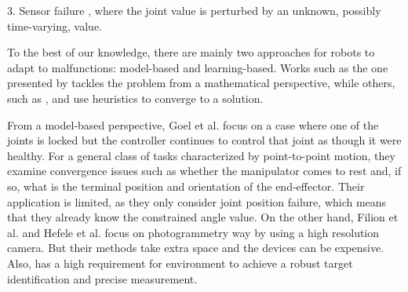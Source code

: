 \documentclass{ieeeaccess}
\begin{document}
3. Sensor failure \cite{english2000measuring},
where the joint value is perturbed by an unknown,
possibly time-varying, value. 
%
%
%
%


To the best of our knowledge, there are mainly two approaches for robots to adapt to malfunctions: model-based and learning-based. Works such as the one presented by \cite{goel2005analyzing} tackles the problem from a mathematical perspective, while others, such as \cite{7832455}, \cite{cully2015robots} and \cite{chatzilygeroudis2017black} use heuristics to converge to a solution.

From a model-based perspective, Goel et al. \cite{goel2005analyzing} focus on a case where one of the joints is locked but the controller continues to control that joint as though it were healthy. For a general class of tasks characterized by point-to-point motion, they examine convergence issues such as whether the manipulator comes to rest and, if so, what is the terminal position and orientation of the end-effector. Their application is limited, as they only consider joint position failure, which means that they already know the constrained angle value. On the other hand, Filion et al. \cite{filion2018robot} and Hefele et al.\cite{hefele2001robot} focus on photogrammetry way by using a high resolution camera. But their methods take extra space and the devices can be expensive. Also, \cite{hefele2001robot} has a high requirement for environment to achieve a robust target identification and precise measurement.
\end{document}
